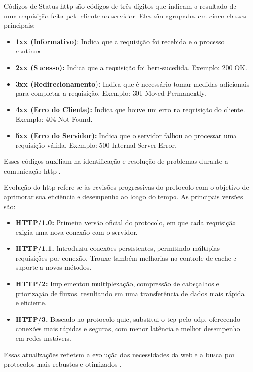 Códigos de Status \acrshort{http} são códigos de três dígitos que indicam o resultado de uma requisição feita pelo cliente ao servidor. Eles são agrupados em cinco classes principais:

\begin{itemize}
    \item \textbf{1xx (Informativo):} Indica que a requisição foi recebida e o processo continua.
    \item \textbf{2xx (Sucesso):} Indica que a requisição foi bem-sucedida. Exemplo: 200 OK.
    \item \textbf{3xx (Redirecionamento):} Indica que é necessário tomar medidas adicionais para completar a requisição. Exemplo: 301 Moved Permanently.
    \item \textbf{4xx (Erro do Cliente):} Indica que houve um erro na requisição do cliente. Exemplo: 404 Not Found.
    \item \textbf{5xx (Erro do Servidor):} Indica que o servidor falhou ao processar uma requisição válida. Exemplo: 500 Internal Server Error.
\end{itemize}

Esses códigos auxiliam na identificação e resolução de problemas durante a comunicação \acrshort{http} \cite{mdn_http}.


Evolução do \acrshort{http} refere-se às revisões progressivas do protocolo com o objetivo de aprimorar sua eficiência e desempenho ao longo do tempo. As principais versões são:

\begin{itemize}
    \item \textbf{HTTP/1.0:} Primeira versão oficial do protocolo, em que cada requisição exigia uma nova conexão com o servidor.
    \item \textbf{HTTP/1.1:} Introduziu conexões persistentes, permitindo múltiplas requisições por conexão. Trouxe também melhorias no controle de cache e suporte a novos métodos.
    \item \textbf{HTTP/2:} Implementou multiplexação, compressão de cabeçalhos e priorização de fluxos, resultando em uma transferência de dados mais rápida e eficiente.
    \item \textbf{HTTP/3:} Baseado no protocolo \acrshort{quic}, substitui o \acrshort{tcp} pelo \acrshort{udp}, oferecendo conexões mais rápidas e seguras, com menor latência e melhor desempenho em redes instáveis.
\end{itemize}

Essas atualizações refletem a evolução das necessidades da web e a busca por protocolos mais robustos e otimizados \cite{cloudflare_http}.

